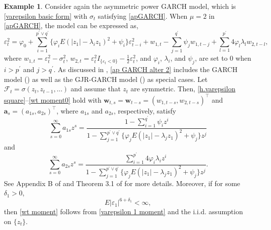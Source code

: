 \documentclass[ejsv2]{imsart}
\theoremstyle{plain}
\theoremstyle{definition}
\newtheorem{example}{Example}[section]
\theoremstyle{remark}
\begin{document}
\begin{example}\label{remark3.1}
Consider again the asymmetric power GARCH model, which is
\eqref{varepsilon basic form} with $\sigma_t$
satisfying \eqref{apGARCH}. %
When $\mu=2$ in \eqref{apGARCH}, the model can be expressed as,
\begin{equation}\label{ap GARCH alter 2}
\varepsilon_t^2=\varphi_{0}+\sum_{i=1}^{p^\prime\vee q^\prime}\{\varphi_{i}E(|z_1|-\lambda_i z_1)^2+\psi_{i}\}\varepsilon_{t-i}^2+w_{1,t}-\sum_{j=1}^{q^\prime}\psi_{j}w_{1,t-j}
+\sum_{l=1}^{p^\prime}4\varphi_{l}\lambda_lw_{2,t-l},
\end{equation}
where $w_{1,t}=\varepsilon_{t}^2-\sigma_{t}^2$, $w_{2,t}=\varepsilon_{t}^2I_{\{\varepsilon_t<0\}}-\frac{1}{2}\varepsilon_{t}^2$, and $\varphi_{i}$, $\lambda_i$, and $\psi_{j}$, are set to 0 when $i>p^\prime$ and $j>q^\prime$.
 As discussed in \cite{Ding1993},
\eqref{ap GARCH alter 2} includes the GARCH model (\cite{Bollerslev1986}) as well as the GJR-GARCH model (\cite{Glosten1993})
as special cases.
Let $\mathcal{F}_{t}=\sigma(z_{t},z_{t-1},\ldots)$
and assume that $z_t$ are symmetric.
Then, 
\eqref{h.varepsilon square}--\eqref{wt moment0} hold with $\bm{w}_{t,s}=\bm{w}_{t-s}=(w_{1,t-s},w_{2,t-s})^\top$ and $\mathbf{a}_s=(a_{1s}, a_{2s})^\top$,
where $a_{1s}$ and $a_{2s}$, respectively, satisfy
\begin{equation*}\label{ap GARCH alter ceof 1}
\sum_{s=0}^{\infty}a_{1s}z^{s}=\frac{1-\sum_{i=1}^{q^\prime}\psi_{i}z^{i}}
{1-\sum_{j=1}^{p^\prime\vee q^\prime}\{\varphi_{j}E(|z_1|-\lambda_j z_1)^2+\psi_{j}\}z^{j}}
\end{equation*}
and
\begin{equation*}\label{ap GARCH alter ceof 2}
\sum_{s=0}^{\infty}a_{2s}z^{s}=\frac{\sum_{i=1}^{p^\prime}4\varphi_{i}\lambda_iz^{i}}
{1-\sum_{j=1}^{p^\prime\vee q^\prime}\{\varphi_{j}E(|z_1|-\lambda_j z_1)^2+\psi_{j}\}z^{j}}.
\end{equation*}
See Appendix B of \cite{Ding1993} and Theorem 3.1 of \cite{Ling2002} for more details.
Moreover, if for some $\delta_1>0$,
\begin{equation}\label{varepsilon 1 moment}
E|\varepsilon_1|^{6+\delta_1}<\infty,
\end{equation}
then \eqref{wt moment} follows from \eqref{varepsilon 1 moment} and the i.i.d. assumption on $\{z_t\}$.
\end{example}
\end{document}
